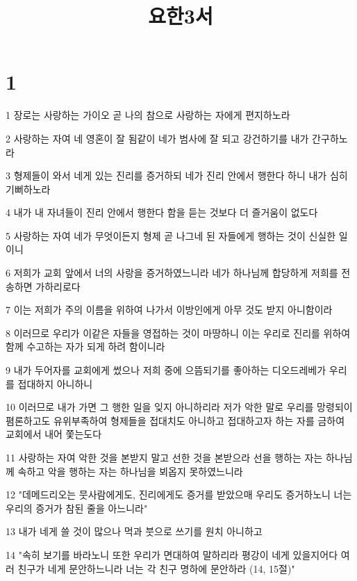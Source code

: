 

\title{요한3서}


\chapter{1}

\par 1 장로는 사랑하는 가이오 곧 나의 참으로 사랑하는 자에게 편지하노라
\par 2 사랑하는 자여 네 영혼이 잘 됨같이 네가 범사에 잘 되고 강건하기를 내가 간구하노라
\par 3 형제들이 와서 네게 있는 진리를 증거하되 네가 진리 안에서 행한다 하니 내가 심히 기뻐하노라
\par 4 내가 내 자녀들이 진리 안에서 행한다 함을 듣는 것보다 더 즐거움이 없도다
\par 5 사랑하는 자여 네가 무엇이든지 형제 곧 나그네 된 자들에게 행하는 것이 신실한 일이니
\par 6 저희가 교회 앞에서 너의 사랑을 증거하였느니라 네가 하나님께 합당하게 저희를 전송하면 가하리로다
\par 7 이는 저희가 주의 이름을 위하여 나가서 이방인에게 아무 것도 받지 아니함이라
\par 8 이러므로 우리가 이같은 자들을 영접하는 것이 마땅하니 이는 우리로 진리를 위하여 함께 수고하는 자가 되게 하려 함이니라
\par 9 내가 두어자를 교회에게 썼으나 저희 중에 으뜸되기를 좋아하는 디오드레베가 우리를 접대하지 아니하니
\par 10 이러므로 내가 가면 그 행한 일을 잊지 아니하리라 저가 악한 말로 우리를 망령되이 폄론하고도 유위부족하여 형제들을 접대치도 아니하고 접대하고자 하는 자를 금하여 교회에서 내어 쫓는도다
\par 11 사랑하는 자여 악한 것을 본받지 말고 선한 것을 본받으라 선을 행하는 자는 하나님께 속하고 악을 행하는 자는 하나님을 뵈옵지 못하였느니라
\par 12 "데메드리오는 뭇사람에게도, 진리에게도 증거를 받았으매 우리도 증거하노니 너는 우리의 증거가 참된 줄을 아느니라"
\par 13 내가 네게 쓸 것이 많으나 먹과 붓으로 쓰기를 원치 아니하고
\par 14 "속히 보기를 바라노니 또한 우리가 면대하여 말하리라 평강이 네게 있을지어다 여러 친구가 네게 문안하느니라 너는 각 친구 명하에 문안하라 (14, 15절)"


